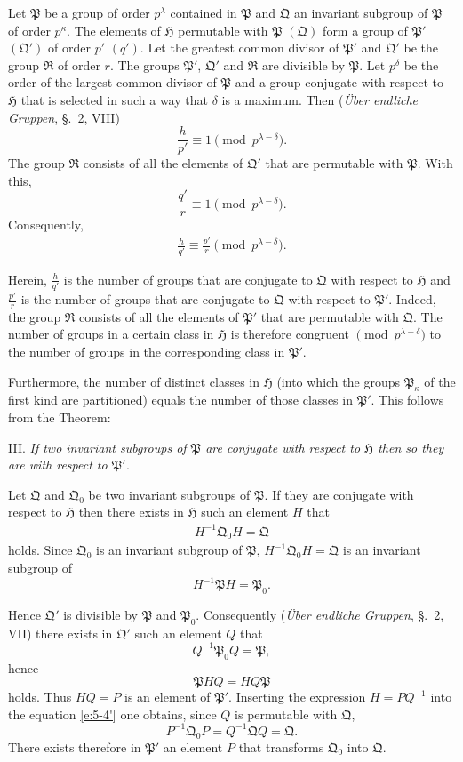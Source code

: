 \documentclass[a5paper,12pt]{article}
\let\fr\mathfrak
\newcommand{\CH}{\fr{H}}
\newcommand{\CP}{\fr{P}}
\newcommand{\CQ}{\fr{Q}}
\newcommand{\CR}{\fr{R}}
\newcommand{\?}{{\color{blue}${}^{(?)}$}}
\newcounter{origpagecounter}{}
\newcommand{\origpagebreak}{\mark{\arabic{origpagecounter}}\addtocounter{origpagecounter}{1}\mark{\arabic{origpagecounter}}}
\begin{document}
Let $\CP$ be a group of order $p^\lambda$
contained in $\CP$
and
$\CQ$ an invariant subgroup of $\CP$ of order $p^\kappa$.
%
%
The elements of $\CH$ permutable with $\CP$ $(\CQ)$
form a group of $\CP'$ $(\CQ')$
of order $p'$ $(q')$.
%
%
Let
the greatest common divisor
of $\CP'$ and $\CQ'$
be the group $\CR$ of order $r$.
%
%
The groups
$\CP'$, $\CQ'$ and $\CR$
are divisible by $\CP$.
%
%
Let $p^\delta$
be the order of
the largest common divisor
of $\CP$
and
a group conjugate
with respect to $\CH$
that is selected
in such a way
that $\delta$ is a maximum.
%
%
Then
(\emph{\"Uber endliche Gruppen}, \S.~2, VIII)
\[
	\frac{h}{p'}
	\equiv
	1
	\pmod{p^{\lambda-\delta}}
	.
\]
%
%
The group $\CR$
consists
of all the elements of $\CQ'$
that are permutable with $\CP$.
%
%
With this,
\[
	\frac{q'}{r} \equiv 1
	\pmod{p^{\lambda-\delta}}
	.
\]
%
%
Consequently,
\begin{align} \label{e:5-7} \tag{7.}
	\frac{h}{q'} \equiv \frac{p'}{r}
	\pmod{p^{\lambda-\delta}}
	.
\end{align}


Herein,
$\frac{h}{q'}$
is the number of groups
that are conjugate to $\CQ$
with respect to $\CH$
and
$\frac{p'}{r}$
is the number of groups
that are conjugate to $\CQ$
with respect to $\CP'$.
%
%
Indeed,
the group $\CR$
consists
of all the elements of $\CP'$
that are permutable with $\CQ$.
%
%
The number of groups
in a certain class in $\CH$
is therefore
congruent $\!\!\pmod{p^{\lambda-\delta}}$
to
the number of groups
in the corresponding class in $\CP'$.


Furthermore,
the number of distinct classes in $\CH$
(into which the groups $\CP_\kappa$ of the first kind
are partitioned)
equals
the number of those classes in $\CP'$.
%
%
This follows from the Theorem:


III.
%
\label{t:5-3}
%
\emph{ %
If two invariant subgroups of $\CP$
are conjugate with respect to $\CH$
then
so they are with respect to $\CP'$.
}


Let $\CQ$ and $\CQ_0$
be two invariant subgroups of $\CP$.
%
%
If they are conjugate with respect to $\CH$
then
there exists in $\CH$
such an element $H$
that
\begin{align} \label{e:5-4'} \tag{4.}
	H^{-1} \CQ_0 H = \CQ
\end{align}
holds.
%
%
Since $\CQ_0$ is an invariant subgroup of $\CP$,
$H^{-1} \CQ_0 H = \CQ$
is an invariant subgroup of
\[
	H^{-1} \CP H = \CP_0
	.
\]
%
%
\origpagebreak
%
%
Hence
$\CQ'$ is divisible by $\CP$ and $\CP_0$.
%
%
Consequently
(\emph{\"Uber endliche Gruppen}, \S.~2, VII)
there exists in $\CQ'$
such an element $Q$
that
\[
	Q^{-1} \CP_0 Q = \CP
	,
\]
hence
\[
	\CP H Q = H Q \CP
\]
holds.
%
%
Thus $H Q = P$
is an element of $\CP'$.
%
%
Inserting the expression $H = P Q^{-1}$
into the equation \eqref{e:5-4'}
one obtains,
since $Q$ is permutable with $\CQ$,
\[
	P^{-1} \CQ_0 P
	=
	Q^{-1} \CQ Q
	=
	\CQ
	.
\]
%
%
There exists therefore
in $\CP'$
an element $P$
that transforms $\CQ_0$ into $\CQ$.
\end{document}
